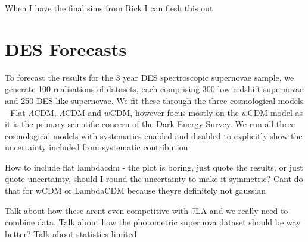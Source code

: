 \documentclass[a4paper,fleqn,usenatbib]{mnras}
\newcommand{\red}{\color{red}}
\begin{document}
{\red When I have the final sims from Rick I can flesh this out}


\section{DES Forecasts}
\label{sec:forecasts}

To forecast the results for the 3 year DES spectroscopic supernovae sample, we generate 100 realisations of datasets, each comprising 300 low redshift supernovae and 250 DES-like supernovae. We fit these through the three cosmological models - Flat $\Lambda$CDM, $\Lambda$CDM and $w$CDM, however focus mostly on the $w$CDM model as it is the primary scientific concern of the Dark Energy Survey. We run all three cosmological models with systematics enabled and disabled to explicitly show the uncertainty included from systematic contribution.

{\red How to include flat lambdacdm - the plot is boring, just quote the results, or just quote uncertainty, should I round the uncertainty to make it symmetric? Cant do that for wCDM or LambdaCDM because theyre definitely not gaussian}

{\red Talk about how these arent even competitive with JLA and we really need to combine data. Talk about how the photometric supernova dataset should be way better? Talk about statistics limited.}
\end{document}

